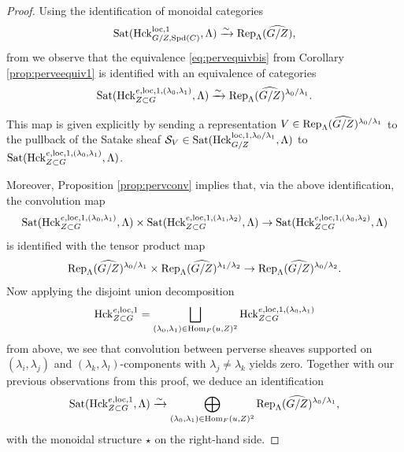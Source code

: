 \begin{proof}
    Using the identification of monoidal categories
    \begin{equation*}
\textnormal{Sat}(\mathrm{Hck}^{\mathrm{loc},1}_{G/Z,\mathrm{Spd}(C)},\Lambda) \xrightarrow{\sim} \textnormal{Rep}_{\Lambda}(\widehat{G/Z}),
    \end{equation*}
    from \cite[Theorem I.6.3]{Geometrization} we observe that the equivalence \eqref{eq:pervequivbis} from Corollary \ref{prop:perveequiv1} is identified with an equivalence of categories
     \begin{equation*}
\textnormal{Sat}(\mathrm{Hck}^{e,\mathrm{loc},1,(\lambda_{0},
\lambda_{1})}_{Z \subset G},\Lambda) \xrightarrow{\sim} \textnormal{Rep}_{\Lambda}(\widehat{G/Z})^{\lambda_{0}/\lambda_{1}}.
    \end{equation*}
 
    This map is given explicitly by sending a representation $V \in \textnormal{Rep}_{\Lambda}(\widehat{G/Z})^{\lambda_{0}/\lambda_{1}}$ to the pullback of the Satake sheaf $\mathcal{S}_{V} \in \textnormal{Sat}(\mathrm{Hck}_{G/Z}^{\mathrm{loc},1,\lambda_{0}/\lambda_{1}},\Lambda)$ to $\textnormal{Sat}(\mathrm{Hck}_{Z \subset G}^{e,\mathrm{loc},1,(\lambda_{0},\lambda_{1})},\Lambda)$.

    Moreover, Proposition \ref{prop:pervconv} implies that, via the above identification, the convolution map
    \begin{equation*}
\textnormal{Sat}(\mathrm{Hck}^{e,\mathrm{loc},1,(\lambda_{0},
\lambda_{1})}_{Z \subset G},\Lambda)  \times \textnormal{Sat}(\mathrm{Hck}^{e,\mathrm{loc},1,(\lambda_{1},
\lambda_{2})}_{Z \subset G},\Lambda) \to \textnormal{Sat}(\mathrm{Hck}^{e,\mathrm{loc},1,(\lambda_{0},
\lambda_{2})}_{Z \subset G},\Lambda) 
    \end{equation*}
    is identified with the tensor product map
    \begin{equation*}
        \textnormal{Rep}_{\Lambda}(\widehat{G/Z})^{\lambda_{0}/\lambda_{1}} \times \textnormal{Rep}_{\Lambda}(\widehat{G/Z})^{\lambda_{1}/\lambda_{2}} \to \textnormal{Rep}_{\Lambda}(\widehat{G/Z})^{\lambda_{0}/\lambda_{2}}.
    \end{equation*}
    Now applying the disjoint union decomposition
    \begin{equation*}
\mathrm{Hck}^{e,\mathrm{loc},1}_{Z \subset G} = \bigsqcup_{(\lambda_{0}, \lambda_{1}) \in \mathrm{Hom}_{F}(u, Z)^{2}} \mathrm{Hck}^{e,\mathrm{loc},1,(\lambda_{0},\lambda_{1})}_{Z \subset G}
\end{equation*}
from above, we see that convolution between perverse sheaves supported on $(\lambda_{i},\lambda_{j})$ and $(\lambda_{k}, \lambda_{l})$-components with $\lambda_{j} \neq \lambda_{k}$ yields zero. Together with our previous observations from this proof, we deduce an identification
\begin{equation*}
     \textnormal{Sat}(\mathrm{Hck}^{e,\mathrm{loc},1}_{Z \subset G},\Lambda) \xrightarrow{\sim} \bigoplus_{(\lambda_{0}, \lambda_{1}) \in \mathrm{Hom}_{F}(u, Z)^{2}} \textnormal{Rep}_{\Lambda}(\widehat{G/Z})^{\lambda_{0}/\lambda_{1}},
\end{equation*}
with the monoidal structure $\star$ on the right-hand side. 
\end{proof}

